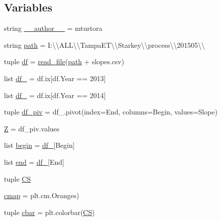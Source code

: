 \subsection*{Variables}
\begin{DoxyCompactItemize}
\item 
string \hyperlink{namespaceheatmap__subplots_a6af073c5f9bb38afeae2782d94abee9e}{\+\_\+\+\_\+author\+\_\+\+\_\+} = \textquotesingle{}mturtora\textquotesingle{}
\item 
string \hyperlink{namespaceheatmap__subplots_ab7df7a9753e857e63f1f8b0490859a31}{path} = \textquotesingle{}I\+:\textbackslash{}\textbackslash{}\+A\+L\+L\textbackslash{}\textbackslash{}\+Tampa\+E\+T\textbackslash{}\textbackslash{}\+Starkey\textbackslash{}\textbackslash{}process\textbackslash{}\textbackslash{}201505\textbackslash{}\textbackslash{}\textquotesingle{}
\item 
tuple \hyperlink{namespaceheatmap__subplots_aefdcfb560a154ac398cf52bf39a33cb0}{df} = \hyperlink{namespaceheatmap__subplots_ad7968080746de03ee0c2965d50fe0ebd}{read\+\_\+file}(\hyperlink{namespaceheatmap__subplots_ab7df7a9753e857e63f1f8b0490859a31}{path} + \textquotesingle{}slopes.\+csv\textquotesingle{})
\item 
list \hyperlink{namespaceheatmap__subplots_a38f24e9de53aa8a935925a0154e4b576}{df\+\_} = df.\+ix\mbox{[}df.\+Year == 2013\mbox{]}
\item 
list \hyperlink{namespaceheatmap__subplots_a664795795d2c75a026821e0bd2a32159}{df\+\_} = df.\+ix\mbox{[}df.\+Year == 2014\mbox{]}
\item 
tuple \hyperlink{namespaceheatmap__subplots_af3b54e7f6c49dd1ad4ed6d5cef1541d0}{df\+\_\+piv} = df\+\_.\+pivot(index=\textquotesingle{}End\textquotesingle{}, columns=\textquotesingle{}Begin\textquotesingle{}, values=\textquotesingle{}Slope\textquotesingle{})
\item 
\hyperlink{namespaceheatmap__subplots_ad2fa7e90b3ea750418e7bfe6c549745f}{Z} = df\+\_\+piv.\+values
\item 
list \hyperlink{namespaceheatmap__subplots_adf6fc02d1af5885087dea1400cdcc546}{begin} = \hyperlink{namespaceheatmap__subplots_a38f24e9de53aa8a935925a0154e4b576}{df\+\_}\mbox{[}\textquotesingle{}Begin\textquotesingle{}\mbox{]}
\item 
list \hyperlink{namespaceheatmap__subplots_a8add050a641ed8526f32e354fffdee93}{end} = \hyperlink{namespaceheatmap__subplots_a38f24e9de53aa8a935925a0154e4b576}{df\+\_}\mbox{[}\textquotesingle{}End\textquotesingle{}\mbox{]}
\item 
tuple \hyperlink{namespaceheatmap__subplots_a7c42f3ab7941ef3754f98b938080fbd4}{C\+S}
\item 
\hyperlink{namespaceheatmap__subplots_a65159fa9d4b96b5413a4469f96972503}{cmap} = plt.\+cm.\+Oranges)
\item 
tuple \hyperlink{namespaceheatmap__subplots_a737acb8a319fcdea231ba28a1fde0f07}{cbar} = plt.\+colorbar(\hyperlink{namespaceheatmap__subplots_a7c42f3ab7941ef3754f98b938080fbd4}{C\+S})
\end{DoxyCompactItemize}


